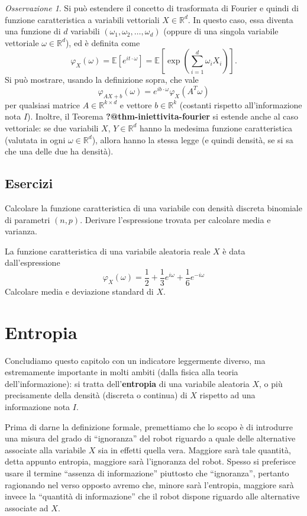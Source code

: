 \documentclass[
  italian,
  letterpaper,
]{book}
\newcommand{\bra}[1]{\left( #1 \right)}
\newcommand{\sqa}[1]{\left[ #1 \right]}
\newcommand{\R}{\mathbb{R}}
\newcommand{\E}[1]{\mathbb{E}\sqa{#1}}
\theoremstyle{definition}
\theoremstyle{remark}
\newtheorem*{remark}{Osservazione}
\begin{document}
\begin{remark}
Si può estendere il concetto di trasformata di Fourier e quindi di
funzione caratteristica a variabili vettoriali \(X \in \R^d\). In questo
caso, essa diventa una funzione di \(d\) variabili
\((\omega_1, \omega_2, \ldots, \omega_d)\) (oppure di una singola
variabile vettoriale \(\omega \in \R^d\)), ed è definita come
\[ \varphi_{X}(\omega) = \E{e^{i t\cdot \omega}} = \E{ \exp \bra{ \sum_{i=1}^d\omega_i X_i}}.\]
Si può mostrare, usando la definizione sopra, che vale
\[  \varphi_{AX+b} (\omega) = e^{i b \cdot \omega} \varphi_X(A^T \omega)\]
per qualsiasi matrice \(A \in \R^{k \times d}\) e vettore \(b \in \R^k\)
(costanti rispetto all'informazione nota \(I\)). Inoltre, il Teorema
\textbf{?@thm-iniettivita-fourier} si estende anche al caso vettoriale:
se due variabili \(X\), \(Y \in \R^d\) hanno la medesima funzione
caratteristica (valutata in ogni \(\omega\in \R^d\)), allora hanno la
stessa legge (e quindi densità, se si sa che una delle due ha densità).
\end{remark}

\subsection{Esercizi}\label{esercizi-23}

Calcolare la funzione caratteristica di una variabile con densità
discreta binomiale di parametri \((n,p)\). Derivare l'espressione
trovata per calcolare media e varianza.

La funzione caratteristica di una variabile aleatoria reale \(X\) è data
dall'espressione
\[ \varphi_X(\omega) = \frac 1 2 + \frac 1 3 e^{i \omega} + \frac 1 6 e^{- i \omega}\]
Calcolare media e deviazione standard di \(X\).

\section{Entropia}\label{sec-entropia}

Concludiamo questo capitolo con un indicatore leggermente diverso, ma
estremamente importante in molti ambiti (dalla fisica alla teoria
dell'informazione): si tratta dell'\textbf{entropia} di una variabile
aleatoria \(X\), o più precisamente della densità (discreta o continua)
di \(X\) rispetto ad una informazione nota \(I\).

Prima di darne la definizione formale, premettiamo che lo scopo è di
introdurre una misura del grado di ``ignoranza'' del robot riguardo a
quale delle alternative associate alla variabile \(X\) sia in effetti
quella vera. Maggiore sarà tale quantità, detta appunto entropia,
maggiore sarà l'ignoranza del robot. Spesso si preferisce usare il
termine ``assenza di informazione'' piuttosto che ``ignoranza'',
pertanto ragionando nel verso opposto avremo che, minore sarà
l'entropia, maggiore sarà invece la ``quantità di informazione'' che il
robot dispone riguardo alle alternative associate ad \(X\).
\end{document}
